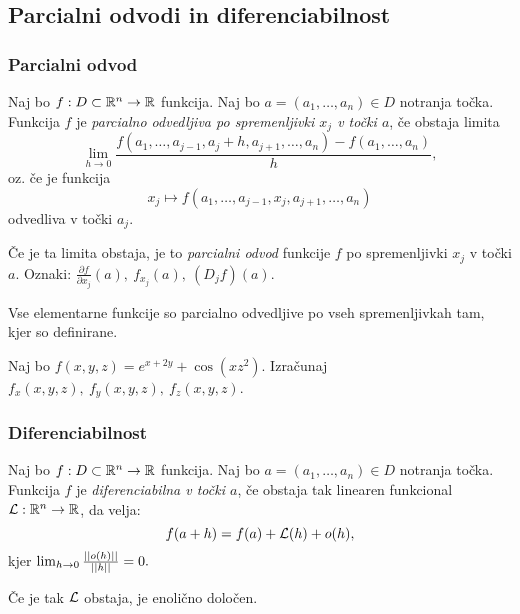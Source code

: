 \newpage
\subsection{Parcialni odvodi in diferenciabilnost}
\subsubsection{Parcialni odvod}
\begin{definicija}
    Naj bo $f: D \subset \mathbb{R}^n \to \mathbb{R}$ funkcija. Naj bo $a = (a_1, \ldots, a_n) \in D$ notranja točka. Funkcija $f$ je \emph{parcialno odvedljiva po spremenljivki $x_j$ v točki $a$}, če obstaja limita 
    $$\lim_{h \to 0} \frac{f(a_1, \ldots, a_{j-1}, a_j+h, a_{j+1}, \ldots, a_n) - f(a_1, \ldots, a_n)}{h},$$
    oz. če je funkcija 
    $$x_j \mapsto f(a_1, \ldots, a_{j-1}, x_j, a_{j+1}, \ldots, a_n)$$
    odvedliva v točki $a_j$.

    Če je ta limita obstaja, je to \emph{parcialni odvod} funkcije $f$ po spremenljivki $x_j$ v točki $a$.
    Oznaki: $\frac{\partial f}{\partial x_j}(a), \ f_{x_j}(a), \ (D_jf)(a)$.
\end{definicija}

\begin{opomba}
    Vse elementarne funkcije so parcialno odvedljive po vseh spremenljivkah tam, kjer so definirane.
\end{opomba}

\begin{zgled}
    Naj bo $f(x, y, z) = e^{x+2y} + \cos(xz^2)$. Izračunaj $f_x(x,y,z), \ f_y(x,y,z), \ f_z(x,y,z)$.
\end{zgled}

\subsubsection{Diferenciabilnost}
\begin{definicija}
    Naj bo $f: D \subset \mathbb{R}^n \to \mathbb{R}$ funkcija. Naj bo $a = (a_1, \ldots, a_n) \in D$ notranja točka. Funkcija $f$ je \emph{diferenciabilna v točki $a$}, če obstaja tak linearen funkcional $\mathcal{L}: \mathbb{R}^n \to \mathbb{R}$, da velja:
    $$f(a+h) = f(a) + \mathcal{L}(h) + o(h),$$
    kjer $\lim_{h \to 0} \frac{||o(h)||}{||h||} = 0.$
\end{definicija}

\begin{opomba}
    Če je tak $\mathcal{L}$ obstaja, je enolično določen.
\end{opomba}

